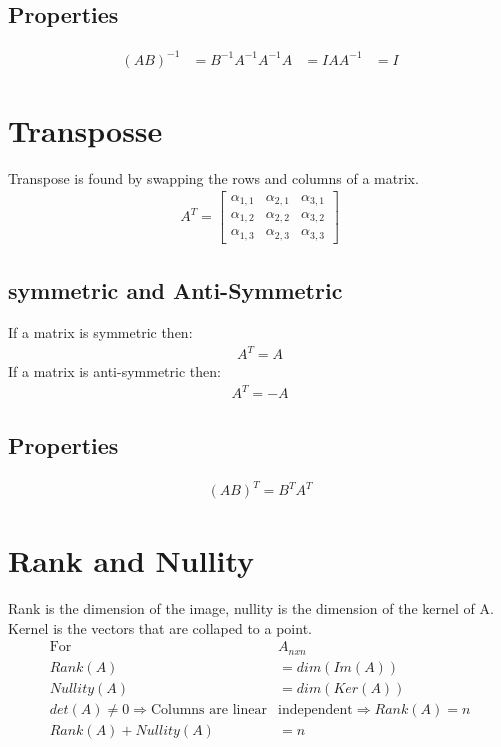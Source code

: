 \documentclass[12pt]{article}
\begin{document}
\subsection{Properties}
\begin{align}
	(AB)^{-1} &= B^{-1}A^{-1}
	A^{-1}A &= I
	AA^{-1} &= I
\end{align}
\section{Transposse}
Transpose is found by swapping the rows and columns of a matrix.
\begin{align}
	A^{T} = \left[ \begin{array}{ccc}
		\alpha_{1,1} & \alpha_{2,1} & \alpha_{3,1}\\
		\alpha_{1,2} & \alpha_{2,2} & \alpha_{3,2}\\
		\alpha_{1,3} & \alpha_{2,3} & \alpha_{3,3}
	\end{array}\right]
\end{align}
\subsection{symmetric and Anti-Symmetric}
If a matrix is symmetric then:
\begin{align}
	A^{T} = A
\end{align}
If a matrix is anti-symmetric then:
\begin{align}
	A^{T} = -A
\end{align}
\subsection{Properties}
\begin{align}
	(AB)^{T} = B^{T}A^{T}
\end{align}
\section{Rank and Nullity}
Rank is the dimension of the image, nullity is the dimension of the kernel of A. Kernel is the vectors that are collaped to a point.
\begin{align}
	\text{For } &A_{nxn}\\
	Rank(A)&=dim(Im(A))\\
	Nullity(A)&=dim(Ker(A))\\
	det(A)\neq0\Rightarrow \text{Columns are linear}&\text{independent} \Rightarrow Rank(A)=n\\
	Rank(A) + Nullity(A) &=n
\end{align}
\end{document}
